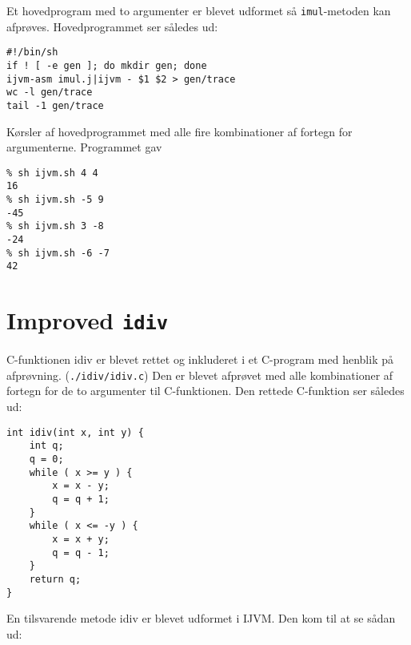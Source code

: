 \documentclass[12pt,a4paper]{article}
\begin{document}
Et hovedprogram med to argumenter er blevet udformet så \texttt{imul}-metoden
kan afprøves. Hovedprogrammet ser således ud:

\lstset{language=sh}
\begin{lstlisting}
#!/bin/sh
if ! [ -e gen ]; do mkdir gen; done
ijvm-asm imul.j|ijvm - $1 $2 > gen/trace
wc -l gen/trace
tail -1 gen/trace
\end{lstlisting}

\clearpage

Kørsler af hovedprogrammet med alle fire kombinationer af fortegn for argumenterne. Programmet gav

\lstset{language=sh}
\begin{lstlisting}
% sh ijvm.sh 4 4
16
% sh ijvm.sh -5 9
-45
% sh ijvm.sh 3 -8
-24
% sh ijvm.sh -6 -7
42
\end{lstlisting}

\section{Improved \texttt{idiv}}

C-funktionen idiv er blevet rettet og inkluderet i et C-program med henblik på afprøvning. (\texttt{./idiv/idiv.c})
Den er blevet afprøvet med alle kombinationer af fortegn for de to argumenter til C-funktionen.
Den rettede C-funktion ser således ud:

\lstset{language=C}
\begin{lstlisting}
int idiv(int x, int y) { 
	int q;
	q = 0;
	while ( x >= y ) {
		x = x - y;
		q = q + 1;
	}
	while ( x <= -y ) {
		x = x + y;
		q = q - 1;
	}
	return q;
}
\end{lstlisting}

En tilsvarende metode idiv er blevet udformet i IJVM. Den kom til at se sådan ud:

\lstset{language=sh}
\begin{lstlisting}

\end{lstlisting}
\end{document}
